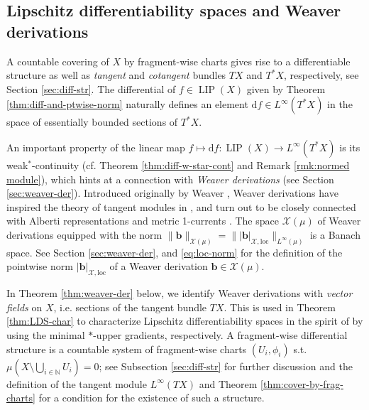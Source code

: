 \documentclass{amsart}
\numberwithin{equation}{section}
\newcommand{\N}{\mathbb{N}}
\newcommand{\LIP}{\operatorname{LIP}}
\newcommand{\ud}{\mathrm {d}}
\newcommand{\loc}{\mathrm{loc}}
\begin{document}
\subsection{Lipschitz differentiability spaces and Weaver derivations}

A countable covering of $X$ by fragment-wise charts gives rise to a differentiable structure as well as \emph{tangent} and \emph{cotangent} bundles $TX$ and $T^*X$, respectively, see Section \ref{sec:diff-str}. The differential of $f\in \LIP(X)$ given by Theorem \ref{thm:diff-and-ptwise-norm}  naturally defines an element $\ud f\in L^\infty(T^*X)$ in the space of essentially bounded sections of $T^*X$.

An important property of the linear map $f\mapsto \ud f:\LIP(X)\to L^\infty(T^*X)$ is its weak$^*$-continuity (cf. Theorem \ref{thm:diff-w-star-cont} and Remark \ref{rmk:normed module}), which hints at a connection with \emph{Weaver derivations} (see Section \ref{sec:weaver-der}). Introduced originally by Weaver \cite{wea99}, Weaver derivations have inspired the theory of tangent modules in \cite{gig15}, and turn out to be closely connected with Alberti representations and metric 1-currents \cite{sch16,sch16b}. The space $\mathcal X(\mu)$ of Weaver derivations equipped with the norm $\|\bm b\|_{\mathcal X(\mu)}=\||\bm b|_{\mathcal X,\loc}\|_{L^\infty(\mu)}$ is a Banach space. See Section \ref{sec:weaver-der}, and \eqref{eq:loc-norm} for the definition of the pointwise norm $|\bm b|_{\mathcal X,\loc}$ of a Weaver derivation $\bm b\in\mathcal X(\mu)$.  

In Theorem \ref{thm:weaver-der} below, we identify Weaver derivations with \emph{vector fields} on $X$, i.e. sections of the tangent bundle $TX$. This is used in Theorem \ref{thm:LDS-char} to characterize Lipschitz differentiability spaces in the spirit of \cite{sch16b} by using the minimal $\ast$-upper gradients, respectively. A fragment-wise differential structure is a countable system of fragment-wise charts $(U_i,\phi_i)$ s.t. $\mu(X\setminus \bigcup_{i\in \N} U_i)=0$; see Subsection \ref{sec:diff-str} for further discussion and the definition of the tangent module $L^\infty(TX)$ and Theorem \ref{thm:cover-by-frag-charts} for a condition for the existence of such a structure.
\end{document}

